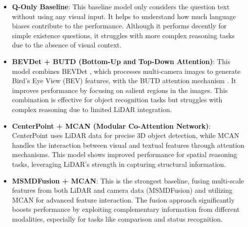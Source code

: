 \documentclass{article} %
\begin{document}
	\begin{itemize}
		\item \textbf{Q-Only Baseline}: This baseline model only considers the question text without using any visual input. It helps to understand how much language biases contribute to the performance. Although it performs decently for simple existence questions, it struggles with more complex reasoning tasks due to the absence of visual context.
		
		\item \textbf{BEVDet + BUTD (Bottom-Up and Top-Down Attention)}: This model combines BEVDet \cite{huang2021bevdet}, which processes multi-camera images to generate Bird’s Eye View (BEV) features, with the BUTD attention mechanism \cite{anderson2018bottom}. It improves performance by focusing on salient regions in the images. This combination is effective for object recognition tasks but struggles with complex reasoning due to limited LiDAR integration.
		
		\item \textbf{CenterPoint + MCAN (Modular Co-Attention Network)}: CenterPoint \cite{yin2021centerpoint} uses LiDAR data for precise 3D object detection, while MCAN \cite{yu2019deep} handles the interaction between visual and textual features through attention mechanisms. This model shows improved performance for spatial reasoning tasks, leveraging LiDAR’s strength in capturing structural information.
		
		\item \textbf{MSMDFusion + MCAN}: This is the strongest baseline, fusing multi-scale features from both LiDAR and camera data (MSMDFusion) \cite{zhang2022msmdfusion} and utilizing MCAN \cite{yu2019deep} for advanced feature interaction. The fusion approach significantly boosts performance by exploiting complementary information from different modalities, especially for tasks like comparison and status recognition.
	\end{itemize}
\end{document}
